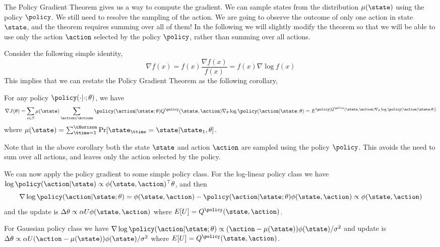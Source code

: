 The Policy Gradient Theorem gives us a way to compute the gradient.
We can sample states from the distribution $\mu(\state)$ using the
policy $\policy$. We still need to resolve the sampling of the
action. We are going to observe the outcome of only one action in
state $\state$, and the theorem requires summing over all of them!
In the following we will slightly modify the theorem so that we will
be able to use only the action $\action$ selected by the policy
$\policy$, rather than summing over all actions.

Consider the following simple identity,
\[
\nabla f(x)=f(x)\frac{\nabla f(x)}{f(x)}=f(x)\nabla \log f(x)
\]
This implies that we can restate the Policy Gradient Theorem as the
following corollary,
\begin{corollary}
\label{thm:policy-gradient-corr} For any policy
$\policy(\cdot|\cdot;\theta)$, we have
\[
\nabla J(\theta)= \sum_{s\in S} \mu(\state) \sum_{\action\in
\Actions} \policy(\action|\state;\theta) Q^\policy
(\state,\action)\nabla_\theta \log \policy(\action|\state;\theta) =
E^\policy[Q^\policy (\state,\action)\nabla_\theta \log
\policy(\action|\state;\theta)]
\]
where $\mu(\state)=\sum_{\ttime=1}^\tHorizon\Pr[\state_\ttime=\state|\state_1,\theta]$.
\end{corollary}
Note that in the above corollary both the state $\state$ and action
$\action$ are sampled using the policy $\policy$. This avoids the need to sum over all actions, and leaves only the action selected by the policy.

We can now apply the policy gradient to some simple policy
class. For the log-linear policy class we have $\log
\policy(\action|\state)\propto \phi(\state,\action)^\top \theta$,
and then
\[
\nabla \log \policy(\action|\state;\theta)= \phi(\state,\action) - \policy(\action|\state;\theta)\phi(\state,\action)\propto \phi(\state,\action)
\]
and the update is $\Delta\theta \propto \alpha U
\phi(\state,\action)$ where $E[U]=Q^\policy(\state,\action)$.

For Gaussian policy class we have $\nabla \log
\policy(\action|\state;\theta)\propto
(\action-\mu(\state))\phi(\state)/\sigma^2$ and update is
$\Delta\theta \propto \alpha U
(\action-\mu(\state))\phi(\state)/\sigma^2$ where
$E[U]=Q^\policy(\state,\action)$.


